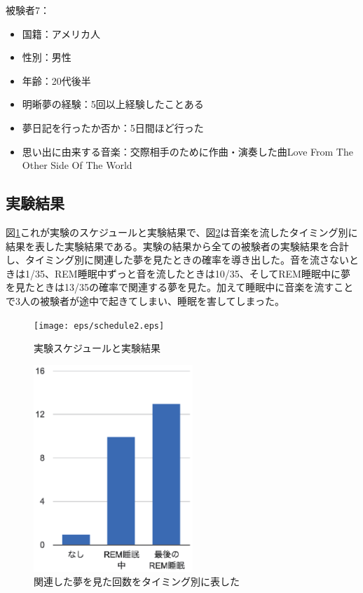 被験者7：
\begin{itemize}
\item 国籍：アメリカ人
\item 性別：男性
\item 年齢：20代後半
\item 明晰夢の経験：5回以上経験したことある
\item 夢日記を行ったか否か：5日間ほど行った
\item 思い出に由来する音楽：交際相手のために作曲・演奏した曲Love From The Other Side Of The World\end{itemize}

\subsection{実験結果}
図\ref{experiment3}これが実験のスケジュールと実験結果で、図\ref{result}は音楽を流したタイミング別に結果を表した実験結果である。実験の結果から全ての被験者の実験結果を合計し、タイミング別に関連した夢を見たときの確率を導き出した。音を流さないときは1/35、REM睡眠中ずっと音を流したときは10/35、そしてREM睡眠中に夢を見たときは13/35の確率で関連する夢を見た。加えて睡眠中に音楽を流すことで3人の被験者が途中で起きてしまい、睡眠を害してしまった。
\begin{figure}[htbp]
\begin{center}
\texttt{[image: eps/schedule2.eps]}
\caption{実験スケジュールと実験結果}
\label{experiment3}
\end{center}
\end{figure}

\begin{figure}[htbp]
\begin{center}
\includegraphics[width=6cm]{eps/result.eps}
\caption{関連した夢を見た回数をタイミング別に表した}
\label{result}
\end{center}
\end{figure}

